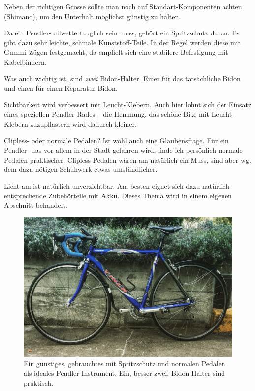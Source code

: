 Neben der richtigen Grösse sollte man noch auf Standart-Komponenten achten
(Shimano), um den Unterhalt möglichst günstig zu halten.

Da ein Pendler-\rv{} allwettertauglich sein muss, gehört ein Spritzschutz
daran. Es gibt dazu sehr leichte, schmale Kunststoff-Teile. In der Regel
werden diese mit Gummi-Zügen festgemacht, da empfielt sich eine stabilere
Befestigung mit Kabelbindern.

Was auch wichtig ist, sind \emph{zwei} Bidon-Halter. Einer für das
tatsächliche Bidon und einen für einen Reparatur-Bidon.

Sichtbarkeit wird verbessert mit Leucht-Klebern. Auch hier lohnt sich der
Einsatz eines speziellen Pendler-Rades -- die Hemmung, das schöne Bike mit
Leucht-Klebern zuzupflastern wird dadurch kleiner.

Clipless- oder normale Pedalen? Ist wohl auch eine Glaubensfrage. Für ein
Pendler-\rv{} das vor allem in der Stadt gefahren wird, finde ich persönlich
normale Pedalen praktischer. Clipless-Pedalen wären am \rv{} natürlich ein
Muss, sind aber wg. dem dazu nötigen Schuhwerk etwas umständlicher.

Licht am \rv{} ist natürlich unverzichtbar. Am besten eignet sich dazu
natürlich entsprechende Zubehörteile mit Akku. Dieses Thema wird in einem
eigenen Abschnitt behandelt.

\begin{figure}[htpb]
        \centering
        \includegraphics[width=\textwidth]{figures/optimales-pendler-rennvelo.jpg}
        \caption{Ein günstiges, gebrauchtes \rv{} mit Spritzschutz und normalen Pedalen
            als ideales Pendler-Instrument. Ein, besser zwei, Bidon-Halter sind praktisch.}
        \label{fig:optimales-pendler-rennvelo}
\end{figure}

